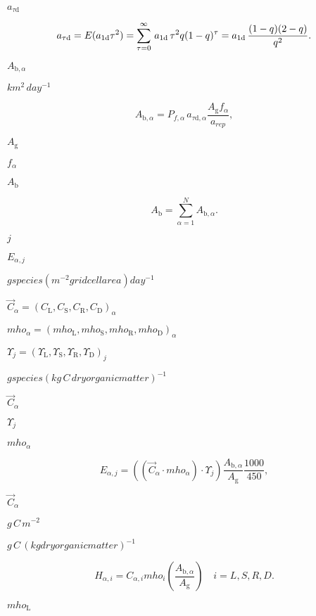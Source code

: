 \documentclass{article}
\begin{document}
$a_{\tau \mathrm{d}}$
\pagebreak

\[ a_{\tau \mathrm{d}} =E(a_{1{\mathrm{d}}} \tau^2)=\sum_{\tau=0}^ \infty\,a_{1{\mathrm{d}}}\,\tau^2 q(1-q)^{\tau} \\ = a_{1{\mathrm{d}}}\, \frac{(1-q) (2-q)}{q^2}.\nonumber \]
\pagebreak

$A_{\mathrm{b},\alpha}$
\pagebreak

$km^2\, day^{-1}$
\pagebreak

\[A_{\mathrm{b},\alpha}=P_{f,\alpha}\,a_{\tau \mathrm{d},\alpha} \frac{A_\mathrm{g}f_\alpha}{a_{rep}}, \]
\pagebreak

$A_\mathrm{g}$
\pagebreak

$f_\alpha$
\pagebreak

$A_\mathrm{b}$
\pagebreak

\[ A_\mathrm{b}=\sum_{\alpha=1}^{N}A_{\mathrm{b},\alpha}.\]
\pagebreak

$j$
\pagebreak

$E_{\alpha,j}$
\pagebreak

$g species (m^{-2} grid cell area) day^{-1}$
\pagebreak

$\vec{C}_{\alpha} = (C_\mathrm{L}, C_\mathrm{S}, C_\mathrm{R}, C_\mathrm{D})_\alpha$
\pagebreak

$mho_{\alpha} = (mho_\mathrm{L}, mho_\mathrm{S}, mho_\mathrm{R}, mho_\mathrm{D})_\alpha$
\pagebreak

$\Upsilon_{j} = (\Upsilon_\mathrm{L}, \Upsilon_\mathrm{S}, \Upsilon_\mathrm{R}, \Upsilon_\mathrm{D})_j$
\pagebreak

$g species (kg\,C\,dry organic matter)^{-1}$
\pagebreak

$\vec{C}_{\alpha}$
\pagebreak

$\Upsilon_{j}$
\pagebreak

$mho_{\alpha} $
\pagebreak

\[ \label{emiss_combust_factor} {E_{\alpha,j}}= ((\vec{C}_\alpha\cdot mho_{\alpha} )\cdot \Upsilon_{j}) \frac{A_{\mathrm{b},\alpha}}{A_\mathrm{g}}\frac{1000}{450}, \]
\pagebreak

$\vec{C}_\alpha$
\pagebreak

$g\,C\,m^{-2}$
\pagebreak

$g\,C\,(kg dry organic matter)^{-1} $
\pagebreak

\[ \label{emiss_combust_loss} H_{\alpha, i}= C_{\alpha, i} mho_i\left(\frac{A_{\mathrm{b},\alpha}}{A_\mathrm{g}}\right)\quad i={L, S, R, D}. \]
\pagebreak

$mho_\mathrm{L}$
\pagebreak
\end{document}
